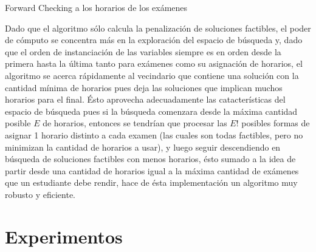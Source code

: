 \documentclass[letter, 10pt]{article}
\begin{document}
\begin{algorithm}[H]
\SetAlgoLined
{}

\caption{Forward Checking a los horarios de los exámenes}
\end{algorithm}
\vspace*{0.4cm}

Dado que el algoritmo sólo calcula la penalización de soluciones factibles, el poder de cómputo se concentra más en la exploración del espacio de búsqueda y, dado que el orden de instanciación de las variables siempre es en orden desde la primera hasta la última tanto para exámenes como su asignación de horarios, el algoritmo se acerca rápidamente al vecindario que contiene una solución con la cantidad mínima de horarios pues deja las soluciones que implican muchos horarios para el final. Ésto aprovecha adecuadamente las catacterísticas del espacio de búsqueda pues si la búsqueda comenzara desde la máxima cantidad posible $E$ de horarios, entonces se tendrían que procesar las $E!$ posibles formas de asignar 1 horario distinto a cada examen (las cuales son todas factibles, pero no minimizan la cantidad de horarios a usar), y luego seguir descendiendo en búsqueda de soluciones factibles con menos horarios, ésto sumado a la idea de partir desde una cantidad de horarios igual a la máxima cantidad de exámenes que un estudiante debe rendir, hace de ésta implementación un algoritmo muy robusto y eficiente.

\section{Experimentos} \label{experimentos}
\end{document}
